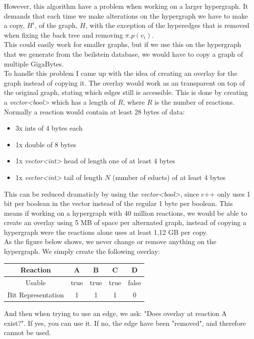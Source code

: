 \documentclass[a4paper,10pt,titlepage]{paper}
\begin{document}
However, this algorithm have a problem when working on a larger hypergraph. It demands that each time we make alterations on the hypergraph we have to make a copy, $H^i$, of the graph, $H$, with the exception of the hyperedges that is removed when fixing the back tree and removing $\pi.p(v_i)$.\\
This could easily work for smaller graphs, but if we use this on the hypergraph that we generate from the beilstein database, we would have to copy a graph of multiple GigaBytes. \\
To handle this problem I came up with the idea of creating an overlay for the graph instead of copying it. The overlay would work as an transparent on top of the original graph, stating which edges still is accessible. This is done by creating a \textit{vector<bool>} which has a length of $R$, where $R$ is the number of reactions. Normally a reaction would contain at least 28 bytes of data:
\begin{itemize}
\item
3x ints of 4 bytes each
\item
1x double of 8 bytes
\item
1x \textit{vector<int>} head of length one of at least 4 bytes
\item
1x \textit{vector<int>} tail of length $N$ (number of educts) of at least 4 bytes
\end{itemize}
This can be reduced dramaticly by using the \textit{vector<bool>}, since c++ only uses 1 bit per boolean in the vector instead of the regular 1 byte per boolean.\cite{VectorBool} This means if working on a hypergraph with 40 million reactions, we would be able to create an overlay using 5 MB of space per alternated graph, instead of copying a hypergraph were the reactions alone uses at least 1,12 GB per copy. \\
As the figure below shows, we never change or remove anything on the hypergraph. We simply create the following overlay:
\begin{table}[H]
\centering
\begin{tabular}{c|c|c|c|c}
Reaction & A & B & C & D \\\hline
Usable & true & true & true & false \\\hline
Bit Representation & 1 & 1 & 1 & 0
\end{tabular}
\end{table} 
And then when trying to use an edge, we ask: "Does overlay at reaction A exist?". If yes, you can use it. If no, the edge have been "removed", and therefore cannot be used.
\end{document}
